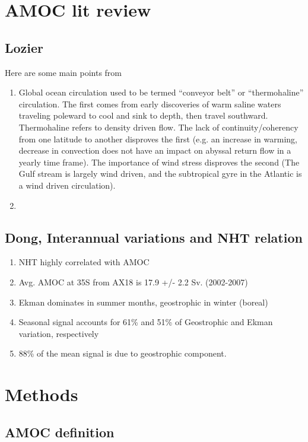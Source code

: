 \documentclass[a4paper,11pt]{article}
\begin{document}
\section{AMOC lit review}

\subsection{Lozier}
Here are some main points from \cite{lozier}
\begin{enumerate}
	\item Global ocean circulation used to be termed ``conveyor belt'' or ``thermohaline'' circulation. The first comes from early discoveries of warm saline waters traveling poleward to cool and sink to depth, then travel southward. Thermohaline refers to density driven flow. The lack of continuity/coherency from one latitude to another disproves the first (e.g. an increase in warming, decrease in convection does not have an impact on abyssal return flow in a yearly time frame). The importance of wind stress disproves the second (The Gulf stream is largely wind driven, and the subtropical gyre in the Atlantic is a wind driven circulation). 
	\item 
\end{enumerate}


\subsection{Dong, Interannual variations and NHT relation}

\begin{enumerate}
	\item NHT highly correlated with AMOC
	\item Avg. AMOC at 35S from AX18 is 17.9 +/- 2.2 Sv. (2002-2007)
	\item Ekman dominates in summer months, geostrophic in winter (boreal)
	\item Seasonal signal accounts for 61\% and 51\% of Geostrophic and Ekman variation, respectively
	\item 88\% of the mean signal is due to geostrophic component. 
\end{enumerate}



\section{Methods}
\label{methods}
  
  \subsection{AMOC definition}
  
\end{document}
